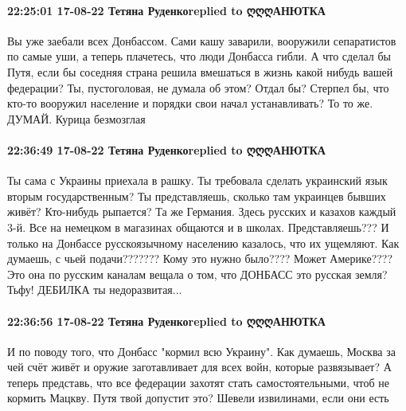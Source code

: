  
 
 
 
 

\paragraph{22:25:01 17-08-22 Тетяна Руденкоreplied to ღღღАНЮТКА}

Вы уже заебали всех Донбассом. Сами кашу заварили, вооружили сепаратистов по
самые уши, а теперь плачетесь, что люди Донбасса гибли. А что сделал бы Путя,
если бы соседняя страна решила вмешаться в жизнь какой нибудь вашей федерации?
Ты, пустоголовая, не думала об этом? Отдал бы? Стерпел бы, что кто-то вооружил
население и порядки свои начал устанавливать? То то же. ДУМАЙ. Курица
безмозглая

\paragraph{22:36:49 17-08-22 Тетяна Руденкоreplied to ღღღАНЮТКА}

Ты сама с Украины приехала в рашку. Ты требовала сделать украинский язык вторым
государственным? Ты представляешь, сколько там украинцев бывших живёт?
Кто-нибудь рыпается? Та же Германия. Здесь русских и казахов каждый 3-й. Все на
немецком в магазинах общаются и в школах. Представляешь??? И только на Донбассе
русскоязычному населению казалось, что их ущемляют. Как думаешь, с чьей
подачи??????? Кому это нужно было???? Может Америке???? Это она по русским
каналам вещала о том, что ДОНБАСС это русская земля? Тьфу! ДЕБИЛКА ты
недоразвитая...

\paragraph{22:36:56 17-08-22 Тетяна Руденкоreplied to ღღღАНЮТКА}

И по поводу того, что Донбасс "кормил всю Украину". Как думаешь, Москва за чей
счёт живёт и оружие заготавливает для всех войн, которые развязывает? А теперь
представь, что все федерации захотят стать самостоятельными, чтоб не кормить
Мацкву. Путя твой допустит это? Шевели извилинами, если они есть
